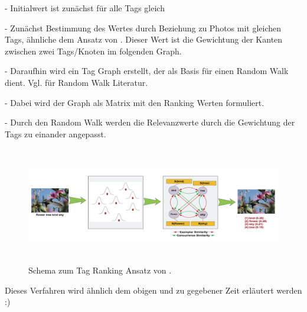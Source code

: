 - Initialwert ist zunächst für alle Tags gleich

- Zunächst Bestimmung des Wertes durch Beziehung zu Photos mit gleichen Tags, ähnliche dem Ansatz von \cite{collectiveKnowledge}. Dieser Wert ist die Gewichtung der Kanten zwischen zwei Tags/Knoten im folgenden Graph.

- Daraufhin wird ein Tag Graph erstellt, der als Basis für einen Random Walk dient. Vgl. \cite{} für Random Walk Literatur. 

- Dabei wird der Graph als Matrix mit den Ranking Werten formuliert. 

- Durch den Random Walk werden die Relevanzwerte durch die Gewichtung der Tags zu einander angepasst.




\begin{figure}[htbp]
  \centering
    \includegraphics[height=2in]{images/tag_ranking_verfahren.png}
  \caption{Schema zum Tag Ranking Ansatz von \cite{ranking}.}
  \label{fig:images_tag_ranking_verfahren}
\end{figure}


Dieses Verfahren wird ähnlich dem obigen und zu gegebener Zeit erläutert werden :)

